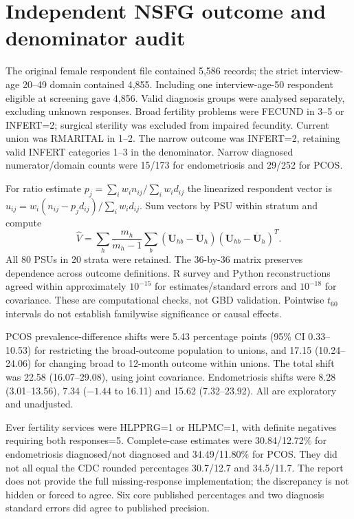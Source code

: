 \section{Independent NSFG outcome and denominator audit}
The original female respondent file contained 5,586 records; the strict interview-age 20--49 domain contained 4,855. Including one interview-age-50 respondent eligible at screening gave 4,856. Valid diagnosis groups were analysed separately, excluding unknown responses. Broad fertility problems were FECUND in 3--5 or INFERT=2; surgical sterility was excluded from impaired fecundity. Current union was RMARITAL in 1--2. The narrow outcome was INFERT=2, retaining valid INFERT categories 1--3 in the denominator. Narrow diagnosed numerator/domain counts were 15/173 for endometriosis and 29/252 for PCOS.

For ratio estimate $p_j=\sum_iw_in_{ij}/\sum_iw_id_{ij}$ the linearized respondent vector is $u_{ij}=w_i(n_{ij}-p_jd_{ij})/\sum_iw_id_{ij}$. Sum vectors by PSU within stratum and compute
\[\widehat V=\sum_h\frac{m_h}{m_h-1}\sum_b(\boldsymbol U_{hb}-\overline{\boldsymbol U}_h)(\boldsymbol U_{hb}-\overline{\boldsymbol U}_h)^T.\]
All 80 PSUs in 20 strata were retained. The 36-by-36 matrix preserves dependence across outcome definitions. R survey and Python reconstructions agreed within approximately $10^{-15}$ for estimates/standard errors and $10^{-18}$ for covariance. These are computational checks, not GBD validation. Pointwise $t_{60}$ intervals do not establish familywise significance or causal effects.

PCOS prevalence-difference shifts were 5.43 percentage points (95\% CI 0.33--10.53) for restricting the broad-outcome population to unions, and 17.15 (10.24--24.06) for changing broad to 12-month outcome within unions. The total shift was 22.58 (16.07--29.08), using joint covariance. Endometriosis shifts were 8.28 (3.01--13.56), 7.34 ($-1.44$ to 16.11) and 15.62 (7.32--23.92). All are exploratory and unadjusted.

Ever fertility services were HLPPRG=1 or HLPMC=1, with definite negatives requiring both responses=5. Complete-case estimates were 30.84/12.72\% for endometriosis diagnosed/not diagnosed and 34.49/11.80\% for PCOS. They did not all equal the CDC rounded percentages 30.7/12.7 and 34.5/11.7. The report does not provide the full missing-response implementation; the discrepancy is not hidden or forced to agree. Six core published percentages and two diagnosis standard errors did agree to published precision.

